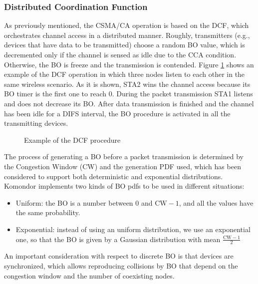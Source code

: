 \documentclass[a4paper]{article}
\begin{document}
		\subsubsection{Distributed Coordination Function}
		\label{section:dcf}		
		As previously mentioned, the CSMA/CA operation is based on the DCF, which orchestrates channel access in a distributed manner. Roughly, transmitters (e.g., devices that have data to be transmitted) choose a random BO value, which is decremented only if the channel is sensed as idle due to the CCA condition. Otherwise, the BO is freeze and the transmission is contended. Figure \ref{fig:dcf_operation} shows an example of the DCF operation in which three nodes listen to each other in the same wireless scenario. As it is shown, STA2 wins the channel access because its BO timer is the first one to reach 0. During the packet transmission STA1 listens and does not decrease its BO. After data transmission is finished and the channel has been idle for a DIFS interval, the BO procedure is activated in all the transmitting devices.
		\begin{figure}[h!]
			\centering
			\caption{Example of the DCF procedure}
			\label{fig:dcf_operation}
		\end{figure}
			
		The process of generating a BO before a packet transmission is determined by the Congestion Window (CW) and the generation PDF used, which has been considered to support both deterministic and exponential distributions. Komondor implements two kinds of BO pdfs to be used in different situations:
		\begin{itemize}
			\item Uniform: the BO is a number between 0 and $\text{CW}-1$, and all the values have the same probability.
			\item Exponential: instead of using an uniform distribution, we use an exponential one, so that the BO is given by a Gaussian distribution with mean $\frac{\text{CW}-1}{2}$
		\end{itemize}
				
		An important consideration with respect to discrete BO is that devices are synchronized, which allows reproducing collisions by BO that depend on the congestion window and the number of coexisting nodes.
		
\end{document}
